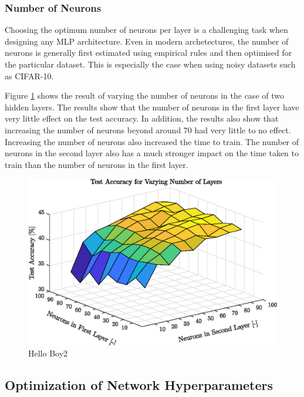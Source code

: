 \subsubsection{Number of Neurons}

Choosing the optimum number of neurons per layer is a challenging task when designing any MLP architecture. Even in modern archetectures, the number of neurons is generally first estimated using empirical rules and then optimised for the particular dataset\cite{lawrence1998size}. This is especially the case when using noisy datasets such as CIFAR-10.

Figure \ref{fig:surfaceLayers} shows the result of varying the number of neurons in the case of two hidden layers. The results show that the number of neurons in the first layer have very little effect on the test accuracy. In addition, the results also show that increasing the number of neurons beyond around 70 had very little to no effect. Increasing the number of neurons also increased the time to train. The number of neurons in the second layer also has a much stronger impact on the time taken to train than the number of neurons in the first layer.

	\begin{figure}[h!]
   		 \centering
   		 \includegraphics{images/surfacelayers}
   		 \caption{Hello Boy2}
   		 \label{fig:surfaceLayers}
    \end{figure}

\subsection{Optimization of Network Hyperparameters}\label{subsec:optNet}

